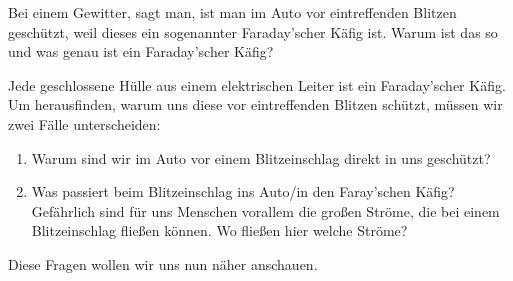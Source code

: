 \documentclass[task=1]{exercise}
\begin{document}
  Bei einem Gewitter, sagt man, ist man im Auto vor eintreffenden Blitzen geschützt, weil dieses ein sogenannter Faraday'scher Käfig ist. Warum ist das so und was genau ist ein Faraday'scher Käfig?
  
  Jede geschlossene Hülle aus einem elektrischen Leiter ist ein Faraday'scher Käfig. Um herausfinden, warum uns diese vor eintreffenden Blitzen schützt, müssen wir zwei Fälle unterscheiden:
  \begin{enumerate}[label=\textnormal{\arabic*)}]
   \item Warum sind wir im Auto vor einem Blitzeinschlag direkt in uns geschützt?
   \item Was passiert beim Blitzeinschlag ins Auto/in den Faray'schen Käfig? Gefährlich sind für uns Menschen vorallem die großen Ströme, die bei einem Blitzeinschlag fließen können. Wo fließen hier welche Ströme?
  \end{enumerate}
  Diese Fragen wollen wir uns nun näher anschauen.
\end{document}
